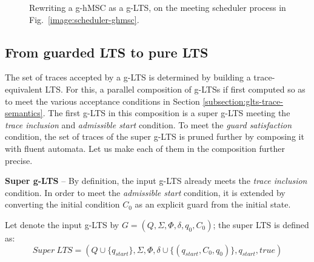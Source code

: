 \begin{figure}[H]\centering
{}
\caption{Rewriting a g-hMSC as a g-LTS, on the meeting scheduler process in Fig.~\ref{image:scheduler-ghmsc}.\label{image:scheduler-ghmsc-glts}}
\end{figure}

\subsection{From guarded LTS to pure LTS\label{subsection:from-glts-to-lts}}

The set of traces accepted by a g-LTS is determined by building a trace-equivalent LTS. For this, a parallel composition of g-LTSs if first computed so as to meet the various acceptance conditions in Section \ref{subsection:glts-trace-semantics}. The first g-LTS in this composition is a super g-LTS meeting the \emph{trace inclusion} and \emph{admissible start} condition. To meet the \emph{guard satisfaction} condition, the set of traces of the super g-LTS is pruned further by composing it with fluent automata. Let us make each of them in the composition further precise.

\noindent \textbf{Super g-LTS} -- By definition, the input g-LTS already meets the \emph{trace inclusion} condition. In order to meet the \emph{admissible start} condition, it is extended by converting the initial condition $C_0$ as an explicit guard from the initial state. 

Let denote the input g-LTS by $G = (Q,\Sigma,\Phi,\delta,q_{0},C_{0})$; the super LTS is defined as:
\begin{equation*}
Super~LTS = (Q \cup \{ q_{start} \}, \Sigma, \Phi, \delta \cup \{(q_{start},C_0,q_0)\},q_{start},true)
\end{equation*}

